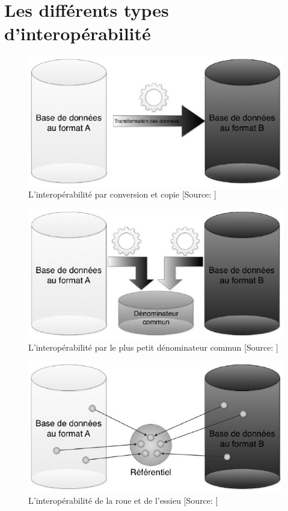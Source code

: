 \chapter{\label{annexe_types_interop}Les différents types d'interopérabilité}

\begin{figure}[!h]
	\centering
	\includegraphics[width=12cm]{images/interop_conversion_copie.jpeg}
	\medskip
	\caption[L'interopérabilité par conversion et copie]{L'interopérabilité par conversion et copie [Source: \cite{bermes_2_2013}]}
\end{figure}

\begin{figure}[!h]
	\centering
	\includegraphics[width=12cm]{images/interop_denom_commun.jpeg}
	\medskip
	\caption[L'interopérabilité par le plus petit dénominateur commun]{L'interopérabilité par le plus petit dénominateur commun [Source: \cite{bermes_2_2013}]}
\end{figure}

\begin{figure}[!h]
\centering
\includegraphics[width=12cm]{images/interop_hub_spoke.jpeg}
\medskip
\caption[L'interopérabilité de le roue et de l'essieu]{L'interopérabilité de la roue et de l'essieu [Source: \cite{bermes_2_2013}]}
\label{hub_spoke}
\end{figure}

